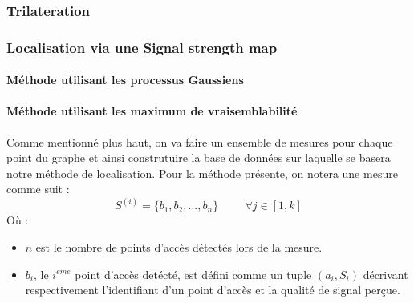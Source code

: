 \documentclass[11pt,journal,compsoc]{IEEEtran}
\begin{document}
    \subsubsection{Trilateration}
    \subsubsection{Localisation via une Signal strength map}
      \paragraph{Méthode utilisant les processus Gaussiens}
      \paragraph{Méthode utilisant les maximum de vraisemblabilité}
        Comme mentionné plus haut, on va faire un ensemble de mesures pour chaque point du graphe et ainsi construtuire la base de données sur laquelle se basera notre méthode de localisation. Pour la méthode présente, on notera une mesure comme suit :
        \[S^{(i)}=\{b_{1}, b_{2}, ..., b_{n}\} \hspace{1cm} \forall j \in [1, k]\]
        Où :
        \begin{itemize}
          \item $n$ est le nombre de points d'accès détectés lors de la mesure.
          \item $b_{i}$, le $i^{eme}$ point d'accès detécté, est défini comme un tuple $(a_{i}, S_{i})$ décrivant respectivement l'identifiant d'un point d'accès et la qualité de signal perçue.
        \end{itemize}
        
\end{document}
